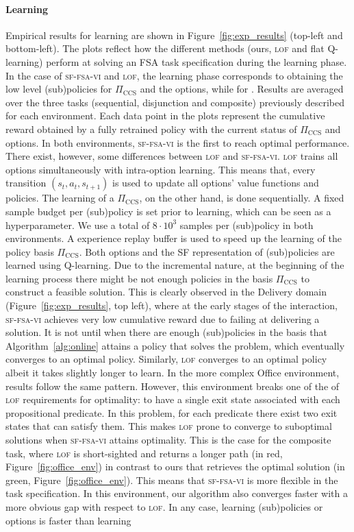 \paragraph{Learning} Empirical results for learning are shown in Figure~\ref{fig:exp_results} (top-left and bottom-left). The plots reflect how the different methods (ours, \textsc{lof} and flat Q-learning) perform at solving an FSA task specification during the learning phase. In the case of \textsc{sf-fsa-vi} and \textsc{lof}, the learning phase corresponds to obtaining the low level (sub)policies for $\Pi_\text{CCS}$ and the options, while for . Results are averaged over the three tasks (sequential, disjunction and composite) previously described for each environment. Each data point in the plots represent the cumulative reward obtained by a fully retrained policy with the current status of $\Pi_\text{CCS}$ and options. In both environments, \textsc{sf-fsa-vi} is the first to reach optimal performance. There exist, however, some differences between \textsc{lof} and \textsc{sf-fsa-vi}. \textsc{lof} trains all options simultaneously with intra-option learning. This means that, every transition $(s_t, a_t, s_{t+1})$ is used to update all options' value functions and policies. The learning of a $\Pi_\text{CCS}$, on the other hand, is done sequentially. A fixed sample budget per (sub)policy is set prior to learning, which can be seen as a hyperparameter. We use a total of $8\cdot 10^3$ samples per (sub)policy in both environments. A experience replay buffer is used to speed up the learning of the policy basis $\Pi_\text{CCS}$. Both options and the SF representation of (sub)policies are learned using Q-learning. Due to the incremental nature, at the beginning of the learning process there might be not enough policies in the basis $\Pi_\text{CCS}$ to construct a feasible solution. This is clearly observed in the Delivery domain (Figure~\ref{fig:exp_results}, top left), where at the early stages of the interaction, \textsc{sf-fsa-vi} achieves very low cumulative reward due to failing at delivering a solution. It is not until when there are enough (sub)policies in the basis that Algorithm~\ref{alg:online} attains a policy that solves the problem, which eventually converges to an optimal policy. Similarly, \textsc{lof} converges to an optimal policy albeit it takes slightly longer to learn. In the more complex Office environment, results follow the same pattern. However, this environment breaks one of the of \textsc{lof} requirements for optimality: to have a single exit state associated with each propositional predicate. In this problem, for each predicate there exist two exit states that can satisfy them. This makes \textsc{lof} prone to converge to suboptimal solutions when \textsc{sf-fsa-vi} attains optimality. This is the case for the composite task, where \textsc{lof} is short-sighted and returns a longer path (in red, Figure~\ref{fig:office_env}) in contrast to ours that retrieves the optimal solution (in green, Figure~\ref{fig:office_env}). This means that \textsc{sf-fsa-vi} is more flexible in the task specification. In this environment, our algorithm also converges faster with a more obvious gap with respect to \textsc{lof}. In any case, learning (sub)policies or options is faster than learning 